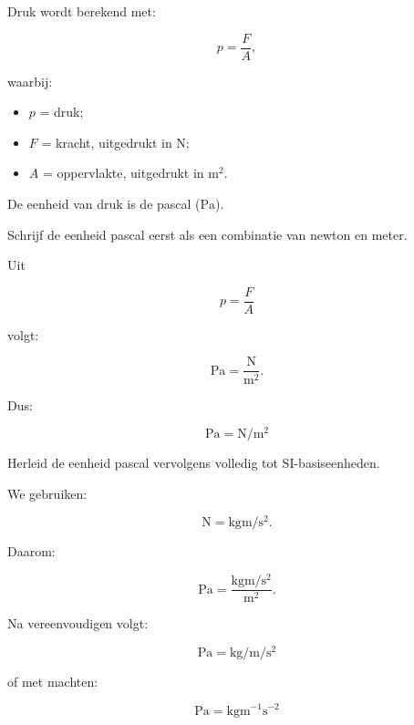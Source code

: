 \documentclass{ximera}
\begin{document}
\begin{oefening}{\oefB\ESS}

Druk wordt berekend met:

\[
p = \frac{F}{A},
\]

waarbij:

\begin{itemize}
    \item $p$ = druk;
    \item $F$ = kracht, uitgedrukt in $\si{\newton}$;
    \item $A$ = oppervlakte, uitgedrukt in $\si{\meter\squared}$.
\end{itemize}

De eenheid van druk is de pascal ($\si{\pascal}$).

\begin{question}
Schrijf de eenheid pascal eerst als een combinatie van newton en meter.

\begin{oplossing}
Uit

\[
p = \frac{F}{A}
\]

volgt:

\[
\si{\pascal}
=
\frac{\si{\newton}}{\si{\meter\squared}}.
\]

Dus:

\[
\boxed{
\si{\pascal}
=
\si{\newton\per\meter\squared}
}
\]
\end{oplossing}
\end{question}


\begin{question}
Herleid de eenheid pascal vervolgens volledig tot SI-basiseenheden.

\begin{oplossing}
We gebruiken:

\[
\si{\newton}
=
\si{\kilogram\meter\per\second\squared}.
\]

Daarom:

\[
\si{\pascal}
=
\frac{
\si{\kilogram\meter\per\second\squared}
}{
\si{\meter\squared}
}.
\]

Na vereenvoudigen volgt:

\[
\boxed{
\si{\pascal}
=
\si{\kilogram\per\meter\per\second\squared}
}
\]

of met machten:

\[
\boxed{
\si{\pascal}
=
\si{\kilogram\meter^{-1}\second^{-2}}
}
\]
\end{oplossing}
\end{question}

\end{oefening}
\end{document}
